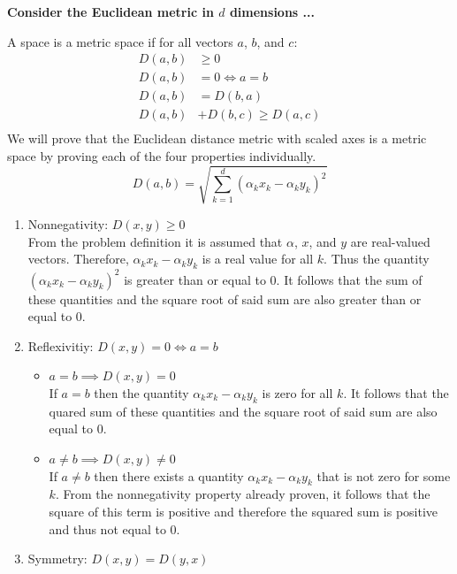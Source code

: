 \documentclass[12pt]{article}
\begin{document}
\begin{enumerate}
\begin{enumerate}
\begin{figure}[H]
\end{figure}
\end{enumerate}
\newpage
{} \textbf{Consider the Euclidean metric in $d$ dimensions ...}

A space is a metric space if for all vectors $a$, $b$, and $c$:
\begin{equation}
\begin{split}
D(a,b) &\geq 0 \\
D(a,b) &= 0 \iff a=b \\
D(a,b) &= D(b,a) \\
D(a,b) &+ D(b,c) \geq D(a,c) \\
\end{split}
\end{equation}
We will prove that the Euclidean distance metric with scaled axes is a metric space by proving each of the four properties individually.
\begin{equation}
D(a,b) = \sqrt{\sum_{k=1}^d(\alpha_k x_k-\alpha_k y_k)^2}
\end{equation}
\begin{enumerate}
\item Nonnegativity: $ D(x,y) \geq 0 $ \\
From the problem definition it is assumed that $\alpha$, $x$, and $y$ are real-valued vectors. Therefore, $\alpha_k x_k-\alpha_k y_k$ is a real value for all $k$. Thus the quantity $(\alpha_k x_k-\alpha_k y_k)^2$ is greater than or equal to 0. It follows that the sum of these quantities and the square root of said sum are also greater than or equal to 0.
\item Reflexivitiy: $ D(x,y) = 0 \iff a=b $
\begin{itemize}
\item $a = b \implies D(x,y) = 0$ \\
If $a = b$ then the quantity $\alpha_k x_k-\alpha_k y_k$ is zero for all $k$. It follows that the quared sum of these quantities and the square root of said sum are also equal to 0.
\item $a \neq b \implies D(x,y) \neq 0$ \\
If $a \neq b$ then there exists a quantity $\alpha_k x_k-\alpha_k y_k$ that is not zero for some $k$. From the nonnegativity property already proven, it follows that the square of this term is positive and therefore the squared sum is positive and thus not equal to 0.
\end{itemize}
\item Symmetry: $ D(x,y) = D(y,x) $ \\

\end{enumerate}
\end{enumerate}
\end{document}
